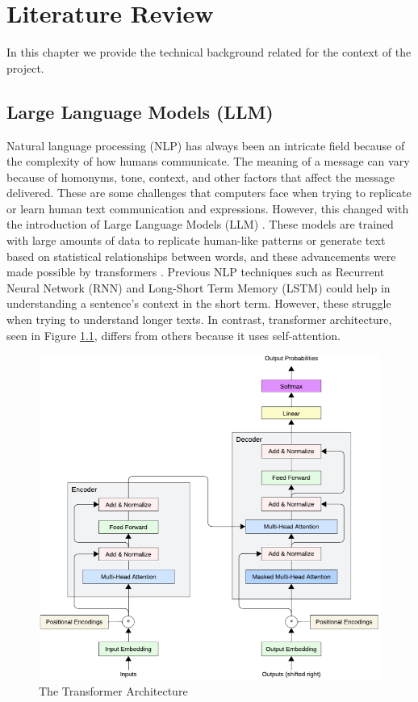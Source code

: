 

\chapter{Literature Review}  

\noindent In this chapter we provide the technical background related for the context of the project.


\section{Large Language Models (LLM)}
Natural language processing (NLP) has always been an intricate field because of the complexity of how humans communicate. The meaning of a message
can vary because of homonyms, tone, context, and other factors that affect the message delivered. These are some challenges that computers face when trying
to replicate or learn human text communication and expressions.  However, this changed with the introduction of Large Language Models (LLM) \cite{naveed2024comprehensiveoverviewlargelanguage}.
These models are trained with large amounts of data to replicate human-like patterns or generate text based on statistical relationships between words, and these
advancements were made possible by transformers \cite{vaswani2023attentionneed}. Previous NLP techniques such as Recurrent Neural Network (RNN) and
Long-Short Term Memory (LSTM) could help in understanding a sentence's context in the short term. However, these struggle when trying to understand longer texts.
In contrast, transformer architecture, seen in Figure \ref{transformer}, differs from others because it uses self-attention.

\begin{figure}[!hb]
    \centering
        \includegraphics[width=1\linewidth]{images/transformers_architecture.png}
        \caption{The Transformer Architecture}
        \label{transformer}
\end{figure}

